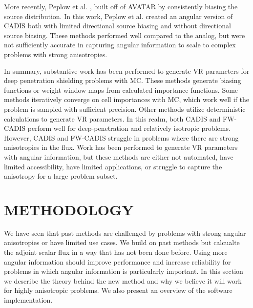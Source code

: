 \documentclass[12pt]{article}
\begin{document}
More recently, Peplow et al. \cite{peplow_consistent_2012}, built off of AVATAR by consistently biasing the source distribution. In this work, Peplow et al. created an angular version of CADIS both with limited directional source biasing and without directional source biasing. These methods performed well compared to the analog, but were not sufficiently accurate in capturing angular information to scale to complex problems with strong anisotropies. 

In summary, substantive work has been performed to generate VR parameters for deep penetration shielding problems with MC. These methods generate biasing functions or weight window maps from calculated importance functions. Some methods iteratively converge on cell importances with MC, which work well if the problem is sampled with sufficient precision. Other methods utilize deterministic calculations to generate VR parameters. In this realm, both CADIS and FW-CADIS perform well for deep-penetration and relatively isotropic problems. However, CADIS and FW-CADIS struggle in problems where there are strong anisotropies in the flux. Work has been performed to generate VR parameters with angular information, but these methods are either not automated, have limited accessibility, have limited applications, or struggle to capture the anisotropy for a large problem subset. 


%
\section{METHODOLOGY}
\label{sect::methodology}

We have seen that past methods are challenged by problems with strong angular anisotropies or have limited use cases.
We build on past methods but calcualte the adjoint scalar flux in a way that has not been done before.
Using more angular information should improve performance and increase reliability for problems in which angular information is particularly important. 
In this section we describe the theory behind the new method and why we believe it will work for highly anisotropic problems. We also present an overview of the software implementation.  

%
\end{document}
